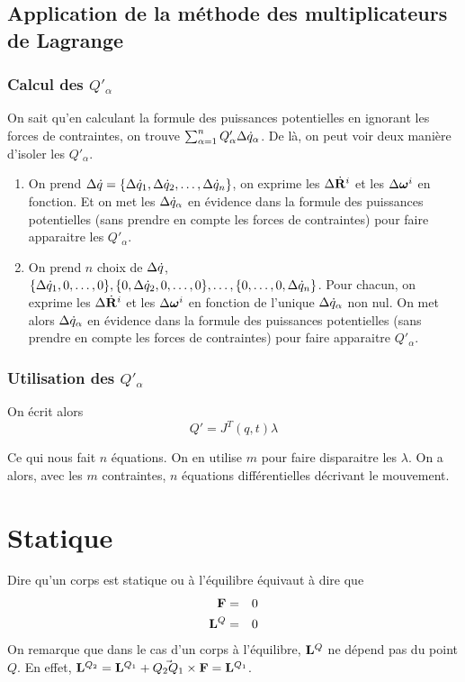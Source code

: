 \subsection{Application de la méthode des multiplicateurs de Lagrange}

\subsubsection{Calcul des $Q'_\alpha$}
On sait qu'en calculant la formule des puissances potentielles en ignorant les forces de contraintes,
on trouve $\sum_{\alpha = 1}^n Q'_\alpha \Delta \dot{q}_\alpha$.
De là, on peut voir deux manière d'isoler les $Q'_\alpha$.
\begin{enumerate}
	\item On prend $\Delta \dot{q} = \{\Delta \dot{q}_1, \Delta \dot{q}_2, \ldots, \Delta \dot{q}_n\}$, on exprime les $\Delta \dot{\bf R}^i$ et les $\Delta {\bm \omega}^i$ en fonction.
		Et on met les $\Delta \dot{q}_\alpha$ en évidence dans la formule des puissances potentielles (sans prendre en compte les forces de contraintes) pour faire apparaitre les $Q'_\alpha$.
	\item On prend $n$ choix de $\Delta \dot{q}$, $\{\Delta \dot{q}_1, 0, \ldots, 0\}, \{0, \Delta \dot{q}_2, 0, \ldots, 0\}, \ldots, \{0, \ldots, 0, \Delta \dot{q}_n\}$.
		Pour chacun, on exprime les $\Delta \dot{\bf R}^i$ et les $\Delta {\bm \omega}^i$ en fonction de l'unique $\Delta \dot{q}_\alpha$ non nul.
		On met alors $\Delta \dot{q}_\alpha$ en évidence dans la formule des puissances potentielles (sans prendre en compte les forces de contraintes) pour faire apparaitre $Q'_\alpha$.
\end{enumerate}

\subsubsection{Utilisation des $Q'_\alpha$}
On écrit alors
\[ Q' = J^T(q, t) \lambda \]

Ce qui nous fait $n$ équations.
On en utilise $m$ pour faire disparaitre les $\lambda$.
On a alors, avec les $m$ contraintes, $n$ équations différentielles décrivant le mouvement.

\section{Statique}

Dire qu'un corps est statique ou à l'équilibre équivaut à dire que
\begin{eqnarray*}
	{\bf F} &=& 0\\
	{\bf L}^Q &=& 0
\end{eqnarray*}
On remarque que dans le cas d'un corps à l'équilibre, ${\bf L}^Q$ ne dépend pas du point $Q$.
En effet, ${\bf L}^{Q_2} = {\bf L}^{Q_1} + \vec{Q_2Q_1} \times {\bf F} = {\bf L}^{Q_1}$.

